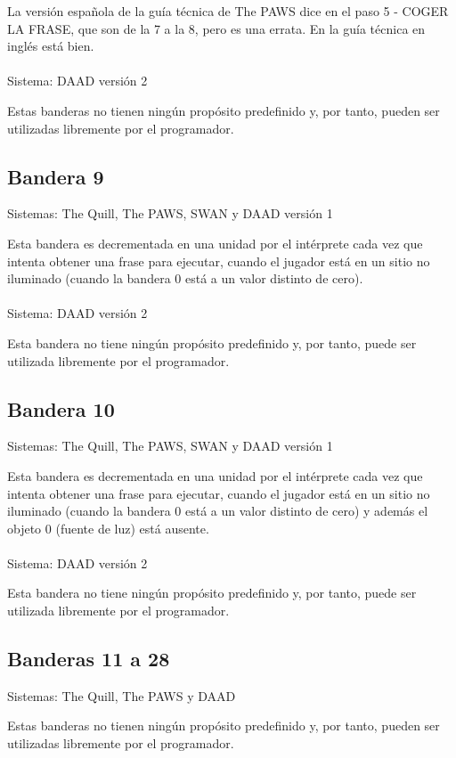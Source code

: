 \documentclass[11pt, a5paper]{article}
\newcommand{\quill}{\textsf{The Quill}\xspace}
\newcommand{\paw}{\textsf{The PAWS}\xspace}
\newcommand{\swan}{\textsf{SWAN}\xspace}
\newcommand{\daad}{\textsf{DAAD}\xspace}
\newcommand{\sistema}[1]{\noindent Sistema: #1 \nopagebreak}
\newcommand{\sistemas}[1]{\noindent Sistemas: #1 \nopagebreak}
\begin{document}
La versión española de la guía técnica de \paw dice en el paso 5 - COGER LA FRASE, que son de la 7 a la 8, pero es una errata. En la guía técnica en inglés \cite{PawsPC} está bien.
\\\ \\
\sistema{\daad versión 2}

Estas banderas no tienen ningún propósito predefinido y, por tanto, pueden ser utilizadas libremente por el programador.

\subsection{Bandera 9}

\sistemas{\quill, \paw, \swan y \daad versión 1}

Esta bandera es decrementada en una unidad por el intérprete cada vez que intenta obtener una frase para ejecutar, cuando el jugador está en un sitio no iluminado (cuando la bandera 0 está a un valor distinto de cero).
\\\ \\
\sistema{\daad versión 2}

Esta bandera no tiene ningún propósito predefinido y, por tanto, puede ser utilizada libremente por el programador.

\subsection{Bandera 10}

\sistemas{\quill, \paw, \swan y \daad versión 1}

Esta bandera es decrementada en una unidad por el intérprete cada vez que intenta obtener una frase para ejecutar, cuando el jugador está en un sitio no iluminado (cuando la bandera 0 está a un valor distinto de cero) y además el objeto 0 (fuente de luz) está ausente.
\\\ \\
\sistema{\daad versión 2}

Esta bandera no tiene ningún propósito predefinido y, por tanto, puede ser utilizada libremente por el programador.

\subsection{Banderas 11 a 28}

\sistemas{\quill, \paw y \daad}

Estas banderas no tienen ningún propósito predefinido y, por tanto, pueden ser utilizadas libremente por el programador.
\end{document}
